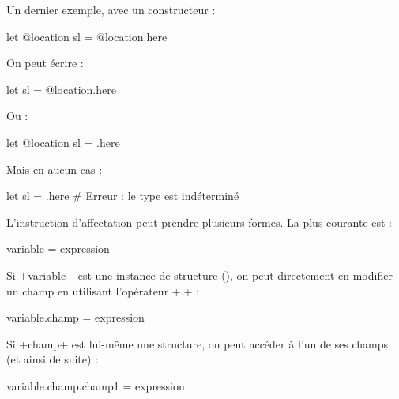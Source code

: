 Un dernier exemple, avec un constructeur :
\begin{galgas}
let @location sl = @location.here
\end{galgas}

On peut écrire :
\begin{galgas}
let sl = @location.here
\end{galgas}

Ou :
\begin{galgas}
let @location sl = .here
\end{galgas}

Mais en aucun cas :
\begin{galgas}
let sl = .here # Erreur : le type est indéterminé
\end{galgas}




















L'instruction d'affectation peut prendre plusieurs formes. La plus courante est :

\begin{galgasbox}
variable = expression
\end{galgasbox}

Si \ggs+variable+ est une instance de structure (), on peut directement en modifier un champ en utilisant l'opérateur \ggs+.+ :

\begin{galgasbox}
variable.champ = expression
\end{galgasbox}

Si \ggs+champ+ est lui-même une structure, on peut accéder à l'un de ses champs (et ainsi de suite) :

\begin{galgasbox}
variable.champ.champ1 = expression
\end{galgasbox}














